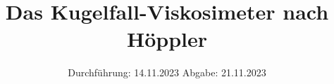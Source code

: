 

\subject{V207}
\title{Das Kugelfall-Viskosimeter nach Höppler}
\date{%
  Durchführung: 14.11.2023
  \hspace{3em}
  Abgabe: 21.11.2023
}



\maketitle
\thispagestyle{empty}
\tableofcontents
\newpage




%

\printbibliography{}

